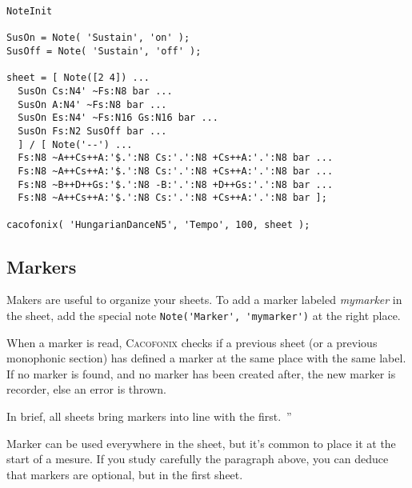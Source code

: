 \documentclass{article}
\newcommand{\cacofonix}{\textsc{Cacofonix}\xspace}
\newenvironment{meenv}{ \par \noindent \makebox[6em][r]{ \textcolor{mecolor}{Me}: `` --~}}{~''}
\newcommand{\me}[1]{\begin{meenv}#1\end{meenv}}
\begin{document}

\begin{lstlisting}
NoteInit

SusOn = Note( 'Sustain', 'on' );
SusOff = Note( 'Sustain', 'off' );

sheet = [ Note([2 4]) ...
  SusOn Cs:N4' ~Fs:N8 bar ...
  SusOn A:N4' ~Fs:N8 bar ...
  SusOn Es:N4' ~Fs:N16 Gs:N16 bar ...
  SusOn Fs:N2 SusOff bar ...
  ] / [ Note('--') ...
  Fs:N8 ~A++Cs++A:'$.':N8 Cs:'.':N8 +Cs++A:'.':N8 bar ...
  Fs:N8 ~A++Cs++A:'$.':N8 Cs:'.':N8 +Cs++A:'.':N8 bar ...
  Fs:N8 ~B++D++Gs:'$.':N8 -B:'.':N8 +D++Gs:'.':N8 bar ...
  Fs:N8 ~A++Cs++A:'$.':N8 Cs:'.':N8 +Cs++A:'.':N8 bar ];

cacofonix( 'HungarianDanceN5', 'Tempo', 100, sheet );
\end{lstlisting}

\subsection{Markers}
\label{sec:Markers}

Makers are useful to organize your sheets. To add a marker labeled \emph{mymarker} in the sheet, add the special note \lstinline!Note('Marker', 'mymarker')! at the right place.

When a marker is read, \cacofonix checks if a previous sheet (or a previous monophonic section) has defined a marker at the same place with the same label. If no marker is found, and no marker has been created after, the new marker is recorder, else an error is thrown.
\me{In brief, all sheets bring markers into line with the first.}

Marker can be used everywhere in the sheet, but it's common to place it at the start of a mesure. If you study carefully the paragraph above, you can deduce that markers are optional, but in the first sheet.
\end{document}
